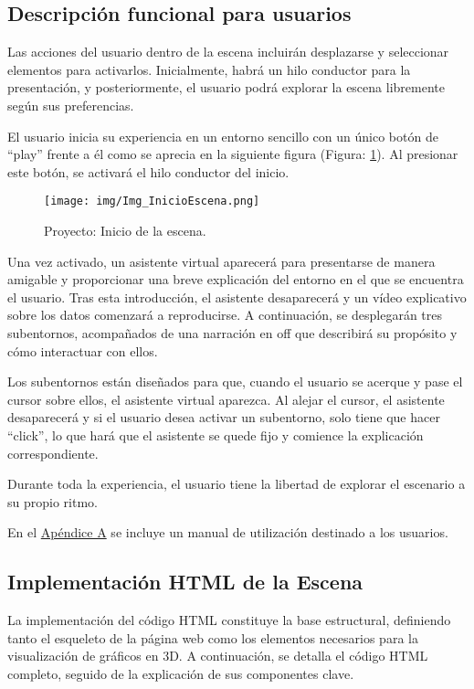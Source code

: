 \documentclass[a4paper, 12pt]{book}
\begin{document}
\subsection{Descripción funcional para usuarios}


Las acciones del usuario dentro de la escena incluirán desplazarse y seleccionar elementos para activarlos. Inicialmente, habrá un hilo conductor para la presentación, y posteriormente, el usuario podrá explorar la escena libremente según sus preferencias. 

El usuario inicia su experiencia en un entorno sencillo con un único botón de ``play'' frente a él como se aprecia en la siguiente figura (Figura: \ref{fig:Img_InicioEscena}). Al presionar este botón, se activará el hilo conductor del inicio.

\begin{figure}[H]
    \centering
    \texttt{[image: img/Img\_InicioEscena.png]}
    \caption{Proyecto: Inicio de la escena.}
    \label{fig:Img_InicioEscena}
\end{figure}

Una vez activado, un asistente virtual aparecerá para presentarse de manera amigable y proporcionar una breve explicación del entorno en el que se encuentra el usuario. Tras esta introducción, el asistente desaparecerá y un vídeo explicativo sobre los datos comenzará a reproducirse. A continuación, se desplegarán tres subentornos, acompañados de una narración en off que describirá su propósito y cómo interactuar con ellos.

Los subentornos están diseñados para que, cuando el usuario se acerque y pase el cursor sobre ellos, el asistente virtual aparezca. Al alejar el cursor, el asistente desaparecerá y si el usuario desea activar un subentorno, solo tiene que hacer ``click'', lo que hará que el asistente se quede fijo y comience la explicación correspondiente.

Durante toda la experiencia, el usuario tiene la libertad de explorar el escenario a su propio ritmo.

En el \hyperref[manual_usuario]{Apéndice A} se incluye un manual de utilización destinado a los usuarios.

\subsection{Implementación HTML de la Escena}

La implementación del código HTML constituye la base estructural, definiendo tanto el esqueleto de la página web como los elementos necesarios para la visualización de gráficos en 3D. A continuación, se detalla el código HTML completo, seguido de la explicación de sus componentes clave.
\end{document}
